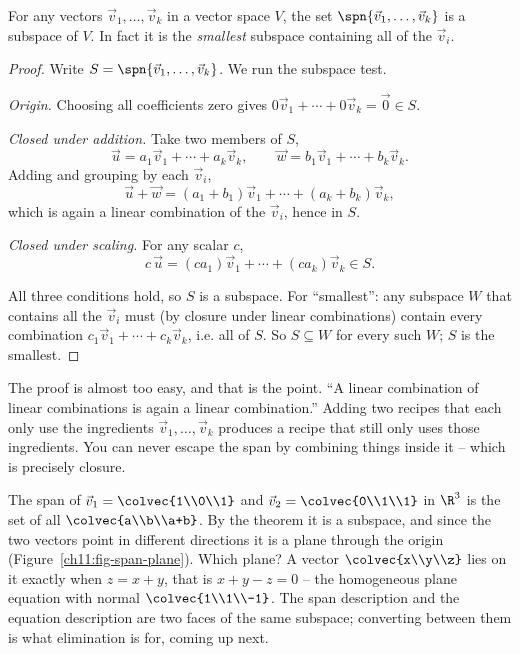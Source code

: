 \begin{theorem}\label{ch11:span-is-subspace}
For any vectors $\vec{v}_1,\dots,\vec{v}_k$ in a vector space $V$, the set
$\spn\{\vec{v}_1,\dots,\vec{v}_k\}$ is a subspace of $V$. In fact it is the
\emph{smallest} subspace containing all of the $\vec{v}_i$.
\end{theorem}

\begin{proof}
Write $S = \spn\{\vec{v}_1,\dots,\vec{v}_k\}$. We run the subspace test.

\emph{Origin.} Choosing all coefficients zero gives
$0\vec{v}_1 + \cdots + 0\vec{v}_k = \vec{0}\in S$.

\emph{Closed under addition.} Take two members of $S$,
\[
\vec{u} = a_1\vec{v}_1 + \cdots + a_k\vec{v}_k, \qquad
\vec{w} = b_1\vec{v}_1 + \cdots + b_k\vec{v}_k.
\]
Adding and grouping by each $\vec{v}_i$,
\[
\vec{u} + \vec{w} = (a_1+b_1)\vec{v}_1 + \cdots + (a_k+b_k)\vec{v}_k,
\]
which is again a linear combination of the $\vec{v}_i$, hence in $S$.

\emph{Closed under scaling.} For any scalar $c$,
\[
c\,\vec{u} = (ca_1)\vec{v}_1 + \cdots + (ca_k)\vec{v}_k \in S.
\]

All three conditions hold, so $S$ is a subspace. For ``smallest'': any subspace $W$ that
contains all the $\vec{v}_i$ must (by closure under linear combinations) contain every
combination $c_1\vec{v}_1+\cdots+c_k\vec{v}_k$, i.e. all of $S$. So $S\subseteq W$ for every
such $W$; $S$ is the smallest.
\end{proof}

\begin{intuitionbox}
The proof is almost too easy, and that is the point. ``A linear combination of linear
combinations is again a linear combination.'' Adding two recipes that each only use the
ingredients $\vec{v}_1,\dots,\vec{v}_k$ produces a recipe that still only uses those
ingredients. You can never escape the span by combining things inside it -- which is
precisely closure.
\end{intuitionbox}

\begin{example}\label{ch11:span-plane}
The span of $\vec{v}_1 = \colvec{1\\0\\1}$ and $\vec{v}_2 = \colvec{0\\1\\1}$ in $\R^3$ is
the set of all $\colvec{a\\b\\a+b}$. By the theorem it is a subspace, and since the two
vectors point in different directions it is a plane through the origin
(Figure~\ref{ch11:fig-span-plane}). Which plane? A
vector $\colvec{x\\y\\z}$ lies on it exactly when $z = x + y$, that is
$x + y - z = 0$ -- the homogeneous plane equation with normal $\colvec{1\\1\\-1}$. The
span description and the equation description are two faces of the same subspace;
converting between them is what elimination is for, coming up next.
\end{example}

